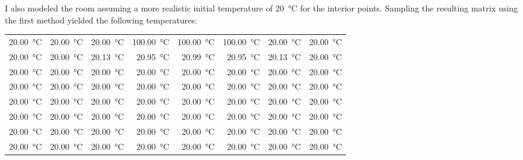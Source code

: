 \documentclass[12pt,letterpaper,oneside]{article}
\begin{document}
I also modeled the room assuming a more realistic initial temperature of \SI{20}{\celsius} for the interior points. Sampling the resulting matrix using the first method yielded the following temperatures:
\begin{center}
	\footnotesize
	\begin{tabular}{@{}r r r r r r r r@{}}
		\SI{20.00}{\celsius} & \SI{20.00}{\celsius} & \SI{20.00}{\celsius} & \SI{100.00}{\celsius} & \SI{100.00}{\celsius} & \SI{100.00}{\celsius} & \SI{20.00}{\celsius} & \SI{20.00}{\celsius} \\
		\SI{20.00}{\celsius} & \SI{20.00}{\celsius} & \SI{20.13}{\celsius} & \SI{20.95}{\celsius} & \SI{20.99}{\celsius} & \SI{20.95}{\celsius} & \SI{20.13}{\celsius} & \SI{20.00}{\celsius}  \\
		\SI{20.00}{\celsius} & \SI{20.00}{\celsius} & \SI{20.00}{\celsius} & \SI{20.00}{\celsius} & \SI{20.00}{\celsius} & \SI{20.00}{\celsius} & \SI{20.00}{\celsius} & \SI{20.00}{\celsius} \\
		\SI{20.00}{\celsius} & \SI{20.00}{\celsius} & \SI{20.00}{\celsius} & \SI{20.00}{\celsius} & \SI{20.00}{\celsius} & \SI{20.00}{\celsius} & \SI{20.00}{\celsius} & \SI{20.00}{\celsius} \\
		\SI{20.00}{\celsius} & \SI{20.00}{\celsius} & \SI{20.00}{\celsius} & \SI{20.00}{\celsius} & \SI{20.00}{\celsius} & \SI{20.00}{\celsius} & \SI{20.00}{\celsius} & \SI{20.00}{\celsius} \\
		\SI{20.00}{\celsius} & \SI{20.00}{\celsius} & \SI{20.00}{\celsius} & \SI{20.00}{\celsius} & \SI{20.00}{\celsius} & \SI{20.00}{\celsius} & \SI{20.00}{\celsius} & \SI{20.00}{\celsius} \\
		\SI{20.00}{\celsius} & \SI{20.00}{\celsius} & \SI{20.00}{\celsius} & \SI{20.00}{\celsius} & \SI{20.00}{\celsius} & \SI{20.00}{\celsius} & \SI{20.00}{\celsius} & \SI{20.00}{\celsius} \\
		\SI{20.00}{\celsius} & \SI{20.00}{\celsius} & \SI{20.00}{\celsius} & \SI{20.00}{\celsius} & \SI{20.00}{\celsius} & \SI{20.00}{\celsius} & \SI{20.00}{\celsius} & \SI{20.00}{\celsius}
	\end{tabular}
	\normalsize
\end{center}
\end{document}
